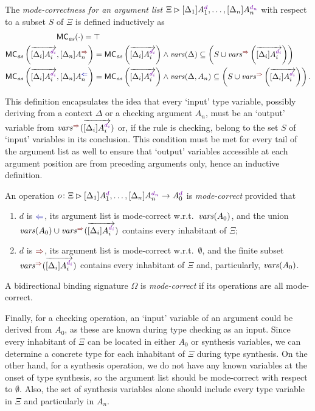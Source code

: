 \begin{definition}\label{def:mode-correctness}
  The \emph{mode-correctness for an argument list} $\Xi \rhd [\Delta_{1}] A_{1}^{\dir{d}}, \ldots, [\Delta_n]A_{n}^{\dir{d_n}}$  with respect to a subset $S$ of $\Xi$ is defined inductively as
  \begin{align*}
    \MC_{\mathit{as}}( \cdot ) ={} & \top \\
    \MC_{\mathit{as}}\left(\overrightarrow{[\Delta_i]A_i^{\dir{d_i}}}, [\Delta_{n}]A_{n}^{\syn}\right) 
    & = \MC_{\mathit{as}}\left(\overrightarrow{[\Delta_i]A_i^{\dir{d_i}}}\right)
    \land \fv(\Delta) \subseteq \left( S \cup \synvar\left(\overrightarrow{[\Delta_i]A_i^{\dir{d_i}}}\right) \right)\\
    \MC_{\mathit{as}}\left(\overrightarrow{[\Delta_i]A_i^{\dir{d_i}}}, [\Delta_{n}]A_{n}^{\chk}\right)
    & = \MC_{\mathit{as}}\left(\overrightarrow{[\Delta_i]A_i^{\dir{d_i}}}\right)
    \land \fv(\Delta, A_n) \subseteq \left( S \cup \synvar\left(\overrightarrow{[\Delta_i]A_i^{\dir{d_i}}}\right)\right).
  \end{align*}
\end{definition}
This definition encapsulates the idea that every `input' type variable, possibly deriving from a context $\Delta$ or a checking argument $A_n$, must be an `output' variable from $\synvar(\overrightarrow{[\Delta_i]A_i^{\dir{d_i}}})$ or, if the rule is checking, belong to the set $S$ of `input' variables in its conclusion.
This condition must be met for every tail of the argument list as well to ensure that `output' variables accessible at each argument position are from preceding arguments only, hence an inductive definition.
\begin{definition}
  An operation $o\colon \Xi \rhd [\Delta_{1}] A_{1}^{\dir{d}}, \ldots, [\Delta_n]A_{n}^{\dir{d_n}} \to A_0^{\dir{d}}$ is \emph{mode-correct} provided that
  \begin{enumerate}
    \item $d$ is $\chk$, its argument list is mode-correct w.r.t.\ $\mathit{vars}(A_0)$, and the union $\fv(A_0) \cup \synvar(\overrightarrow{[\Delta_i]A_i^{\dir{d_i}}})$ contains every inhabitant of $\Xi$;
    \item $d$ is $\syn$, its argument list is mode-correct w.r.t.\ $\emptyset$, and the finite subset $\synvar(\overrightarrow{[\Delta_i]A_i^{\dir{d_i}}})$ contains every inhabitant of $\Xi$ and, particularly, $\mathit{vars}(A_0)$.
  \end{enumerate}
  A bidirectional binding signature $\Omega$ is \emph{mode-correct} if its operations are all mode-correct.
\end{definition}
Finally, for a checking operation, an `input' variable of an argument could be derived from $A_0$, as these are known during type checking as an input.
Since every inhabitant of $\Xi$ can be located in either $A_0$ or synthesis variables, we can determine a concrete type for each inhabitant of $\Xi$ during type synthesis.
On the other hand, for a synthesis operation, we do not have any known variables at the onset of type synthesis, so the argument list should be mode-correct with respect to $\emptyset$.
Also, the set of synthesis variables alone should include every type variable in $\Xi$ and particularly in $A_n$.

